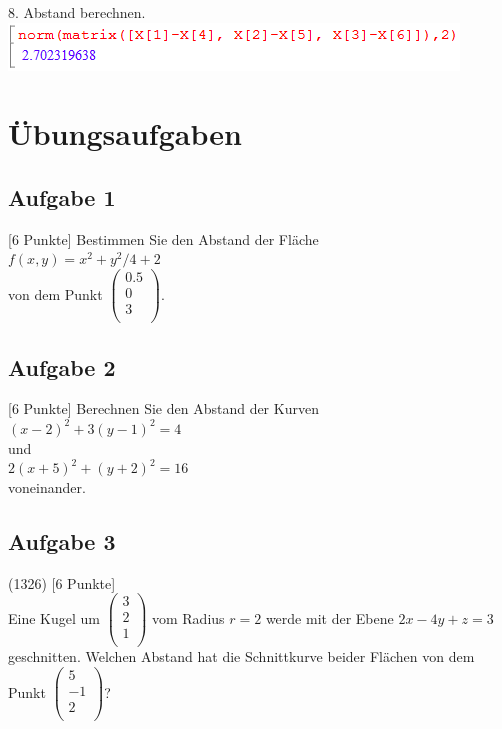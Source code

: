 \documentclass[11pt,final]{scrreprt}
\begin{document}
8. Abstand berechnen.\\

\includegraphics[scale=2.2]{images/abstandsproblem3/abstand.png}

\section{Übungsaufgaben}

\subsection{Aufgabe 1}

[6 Punkte] Bestimmen Sie den Abstand der Fläche\\
$ f(x, y) = x^2 + y^2/4 + 2 $\\
von dem Punkt $\left(\begin{matrix}
0.5\\0\\3\\
\end{matrix}\right) $.\\

\subsection{Aufgabe 2}

[6 Punkte] Berechnen Sie den Abstand der Kurven\\
$(x - 2)^2 + 3(y - 1)^2 = 4$\\
und\\
$2(x + 5)^2 + (y + 2)^2 = 16$\\
voneinander.\\

\subsection{Aufgabe 3}
(1326) [6 Punkte]\\
Eine Kugel um $\left( \begin{matrix}
3\\2\\1\\
\end{matrix} \right) $ vom Radius $r=2$ werde mit der Ebene $2x-4y+z=3$ geschnitten. Welchen Abstand hat die Schnittkurve beider Flächen von dem Punkt $\left( \begin{matrix}
5\\-1\\2\\
\end{matrix} \right) $?\\
\end{document}
